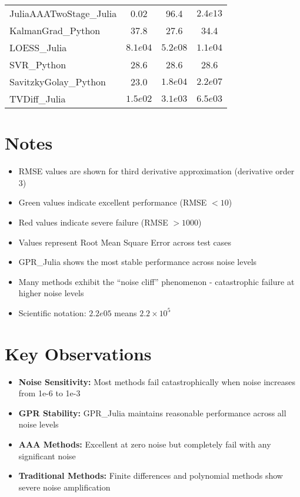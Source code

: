 \documentclass[11pt]{article}
\begin{document}
\begin{center}
\begin{tabular}{@{}l|ccc@{}}
JuliaAAATwoStage\_Julia & \textcolor{successgreen}{0.02} & 96.4 & \textcolor{errorred}{$2.4e13$} \\
KalmanGrad\_Python & 37.8 & 27.6 & 34.4 \\
LOESS\_Julia & \textcolor{errorred}{$8.1e04$} & \textcolor{errorred}{$5.2e08$} & \textcolor{errorred}{$1.1e04$} \\
SVR\_Python & 28.6 & 28.6 & 28.6 \\
SavitzkyGolay\_Python & 23.0 & \textcolor{errorred}{$1.8e04$} & \textcolor{errorred}{$2.2e07$} \\
TVDiff\_Julia & $1.5e02$ & \textcolor{errorred}{$3.1e03$} & \textcolor{errorred}{$6.5e03$} \\
\bottomrule
\end{tabular}
\end{center}

\section{Notes}
\begin{itemize}
\item RMSE values are shown for third derivative approximation (derivative order 3)
\item \textcolor{successgreen}{Green values} indicate excellent performance (RMSE $< 10$)
\item \textcolor{errorred}{Red values} indicate severe failure (RMSE $> 1000$)
\item Values represent Root Mean Square Error across test cases
\item GPR\_Julia shows the most stable performance across noise levels
\item Many methods exhibit the ``noise cliff'' phenomenon - catastrophic failure at higher noise levels
\item Scientific notation: $2.2e05$ means $2.2 \times 10^5$
\end{itemize}

\section{Key Observations}
\begin{itemize}
\item \textbf{Noise Sensitivity:} Most methods fail catastrophically when noise increases from 1e-6 to 1e-3
\item \textbf{GPR Stability:} GPR\_Julia maintains reasonable performance across all noise levels
\item \textbf{AAA Methods:} Excellent at zero noise but completely fail with any significant noise
\item \textbf{Traditional Methods:} Finite differences and polynomial methods show severe noise amplification
\end{itemize}
\end{document}
